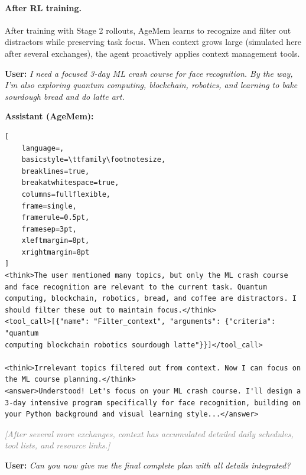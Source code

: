 \paragraph{After RL training.}
After training with Stage 2 rollouts, AgeMem learns to recognize and filter out distractors while preserving task focus. When context grows large (simulated here after several exchanges), the agent proactively applies context management tools.

\vspace{0.3cm}
\noindent\textbf{User:} \textit{I need a focused 3-day ML crash course for face recognition. By the way, I'm also exploring quantum computing, blockchain, robotics, and learning to bake sourdough bread and do latte art.}

\vspace{0.2cm}
\noindent\textbf{Assistant (AgeMem):}
\begin{footnotesize}
\begin{lstlisting}[
    language=,
    basicstyle=\ttfamily\footnotesize,
    breaklines=true,
    breakatwhitespace=true,
    columns=fullflexible,
    frame=single,
    framerule=0.5pt,
    framesep=3pt,
    xleftmargin=8pt,
    xrightmargin=8pt
]
<think>The user mentioned many topics, but only the ML crash course and face recognition are relevant to the current task. Quantum computing, blockchain, robotics, bread, and coffee are distractors. I should filter these out to maintain focus.</think>
<tool_call>[{"name": "Filter_context", "arguments": {"criteria": "quantum 
computing blockchain robotics sourdough latte"}}]</tool_call>

<think>Irrelevant topics filtered out from context. Now I can focus on the ML course planning.</think>
<answer>Understood! Let's focus on your ML crash course. I'll design a 3-day intensive program specifically for face recognition, building on your Python background and visual learning style...</answer>
\end{lstlisting}
\end{footnotesize}

\vspace{0.25cm}
\noindent\textcolor{gray}{\textit{[After several more exchanges, context has accumulated detailed daily schedules, tool lists, and resource links.]}}

\vspace{0.2cm}
\noindent\textbf{User:} \textit{Can you now give me the final complete plan with all details integrated?}

